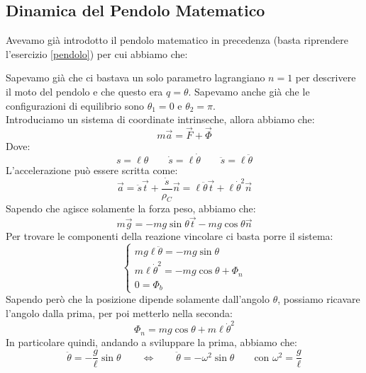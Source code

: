\documentclass[11pt,a4paper,twoside]{article}
\theoremstyle{definition}
\begin{document}
\subsection{Dinamica del Pendolo Matematico}

Avevamo già introdotto il pendolo matematico in precedenza (basta riprendere l'esercizio \ref{pendolo}) per cui abbiamo che:
	\begin{center}
	\end{center}
Sapevamo già che ci bastava un solo parametro lagrangiano $n = 1$ per descrivere il moto del pendolo e che questo era $q=\theta$. Sapevamo anche già che le configurazioni di equilibrio sono $\theta_1 = 0$ e $\theta_2 = \pi$.\\
Introduciamo un sistema di coordinate intrinseche, allora abbiamo che:
\[ m\vec a = \vec F + \vec \Phi \]
Dove:
\[ s = \ell\theta \qquad \dot s = \ell \dot \theta \qquad \ddot s = \ell \ddot \theta \]
L'accelerazione può essere scritta come:
\[ \vec a = \ddot s \vec t + \frac{\dot s}{\rho_C}\vec n = \ell \ddot \theta \vec t + \ell \dot\theta^2 \vec n \]
Sapendo che agisce solamente la forza peso, abbiamo che:
\[ m\vec g = -mg\sin \theta \vec t - mg \cos \theta \vec n \]
Per trovare le componenti della reazione vincolare ci basta porre il sistema:
\[\begin{cases}
	mg\ell \ddot \theta = -mg \sin \theta\\
	m\ell \dot \theta^2 = -mg\cos \theta + \Phi_n\\
	0 = \Phi_b
\end{cases}\]
Sapendo però che la posizione dipende solamente dall'angolo $\theta$, possiamo ricavare l'angolo dalla prima, per poi metterlo nella seconda:
\[ \Phi_n = mg \cos \theta + m\ell \dot\theta^2 \]
In particolare quindi, andando a sviluppare la prima, abbiamo che:
\[ \ddot \theta = -\frac g \ell \sin \theta \qquad \Leftrightarrow \qquad \ddot \theta = -\omega^2 \sin \theta \qquad \text{con }\omega^2 = \frac g\ell \]
\end{document}
